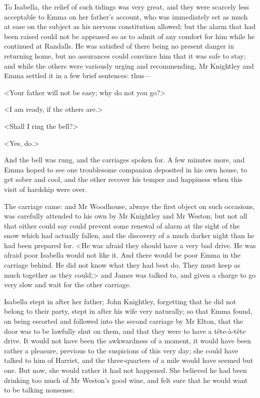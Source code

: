 To Isabella, the relief of such tidings was very great, and they were scarcely less acceptable to Emma on her father's account, who was immediately set as much at ease on the subject as his nervous constitution allowed; but the alarm that had been raised could not be appeased so as to admit of any comfort for him while he continued at Randalls. He was satisfied of there being no present danger in returning home, but no assurances could convince him that it was safe to stay; and while the others were variously urging and recommending, Mr Knightley and Emma settled it in a few brief sentences: thus—

<Your father will not be easy; why do not you go?>

<I am ready, if the others are.>

<Shall I ring the bell?>

<Yes, do.>

And the bell was rung, and the carriages spoken for. A few minutes more, and Emma hoped to see one troublesome companion deposited in his own house, to get sober and cool, and the other recover his temper and happiness when this visit of hardship were over.

The carriage came: and Mr Woodhouse, always the first object on such occasions, was carefully attended to his own by Mr Knightley and Mr Weston; but not all that either could say could prevent some renewal of alarm at the sight of the snow which had actually fallen, and the discovery of a much darker night than he had been prepared for. <He was afraid they should have a very bad drive. He was afraid poor Isabella would not like it. And there would be poor Emma in the carriage behind. He did not know what they had best do. They must keep as much together as they could;> and James was talked to, and given a charge to go very slow and wait for the other carriage.

Isabella stept in after her father; John Knightley, forgetting that he did not belong to their party, stept in after his wife very naturally; so that Emma found, on being escorted and followed into the second carriage by Mr Elton, that the door was to be lawfully shut on them, and that they were to have a tête-à-tête drive. It would not have been the awkwardness of a moment, it would have been rather a pleasure, previous to the suspicions of this very day; she could have talked to him of Harriet, and the three-quarters of a mile would have seemed but one. But now, she would rather it had not happened. She believed he had been drinking too much of Mr Weston's good wine, and felt sure that he would want to be talking nonsense.

